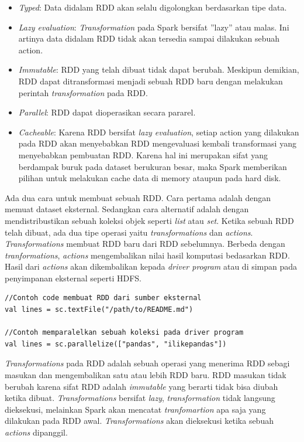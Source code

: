 \documentclass[a4paper,twoside]{article}
\begin{document}
\begin{enumerate}
\begin{itemize}
\item \textit{Typed}: Data didalam RDD akan selalu digolongkan berdasarkan tipe data.

\item \textit{Lazy evaluation}: \textit{Transformation} pada Spark bersifat ”lazy” atau malas. Ini artinya data didalam RDD tidak akan tersedia sampai dilakukan sebuah action.

\item \textit{Immutable}: RDD yang telah dibuat tidak dapat berubah. Meskipun demikian, RDD
dapat ditransformasi menjadi sebuah RDD baru dengan melakukan perintah \textit{transformation}
pada RDD.

\item \textit{Parallel}: RDD dapat dioperasikan secara pararel.

\item \textit{Cacheable}: Karena RDD bersifat \textit{lazy evaluation}, setiap action yang dilakukan pada RDD akan
menyebabkan RDD mengevaluasi kembali transformasi yang menyebabkan pembuatan RDD. Karena hal ini merupakan sifat yang berdampak buruk pada dataset berukuran besar, maka Spark memberikan pilihan untuk melakukan cache data di memory ataupun pada hard disk.

\end{itemize}

Ada dua cara untuk membuat sebuah RDD. Cara pertama adalah dengan memuat dataset eksternal. Sedangkan cara alternatif adalah dengan mendistribustikan sebuah koleksi objek seperti \textit{list} atau \textit{set}. Ketika sebuah RDD telah dibuat, ada dua tipe operasi yaitu \textit{transformations} dan \textit{actions}. \textit{Transformations} membuat RDD baru dari RDD sebelumnya. Berbeda dengan \textit{tranformations}, \textit{actions} mengembalikan nilai hasil komputasi bedasarkan RDD. Hasil dari \textit{actions} akan dikembalikan kepada \textit{driver program} atau di simpan pada penyimpanan eksternal seperti HDFS.

\begin{verbatim}
//Contoh code membuat RDD dari sumber eksternal 
val lines = sc.textFile("/path/to/README.md")

//Contoh memparalelkan sebuah koleksi pada driver program
val lines = sc.parallelize(["pandas", "ilikepandas"])
\end{verbatim}


\textit{Transformations} pada RDD adalah sebuah operasi yang menerima RDD sebagi masukan dan mengembalikan satu atau lebih RDD baru. RDD masukan tidak berubah karena sifat RDD adalah \textit{immutable} yang berarti tidak bisa diubah ketika dibuat. \textit{Transformations} bersifat \textit{lazy}, \textit{transformation} tidak langsung dieksekusi, melainkan Spark akan mencatat \textit{tranfomartion} apa saja yang dilakukan pada RDD awal. \textit{Transformations} akan dieksekusi ketika sebuah \textit{actions} dipanggil.\\


\end{enumerate}
\end{document}
